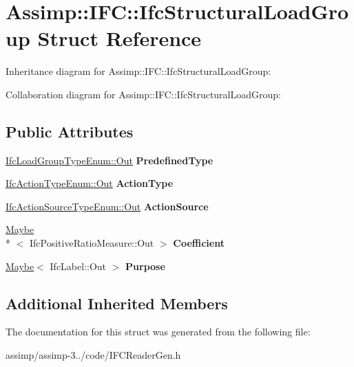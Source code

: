 \hypertarget{struct_assimp_1_1_i_f_c_1_1_ifc_structural_load_group}{\section{Assimp\+:\+:I\+F\+C\+:\+:Ifc\+Structural\+Load\+Group Struct Reference}
\label{struct_assimp_1_1_i_f_c_1_1_ifc_structural_load_group}
}


Inheritance diagram for Assimp\+:\+:I\+F\+C\+:\+:Ifc\+Structural\+Load\+Group\+:


Collaboration diagram for Assimp\+:\+:I\+F\+C\+:\+:Ifc\+Structural\+Load\+Group\+:
\subsection*{Public Attributes}
\begin{DoxyCompactItemize}
\item 
\hypertarget{struct_assimp_1_1_i_f_c_1_1_ifc_structural_load_group_a135570759497f46f4d4e6abe74a517a1}{\hyperlink{classboost_1_1shared__ptr}{Ifc\+Load\+Group\+Type\+Enum\+::\+Out} {\bfseries Predefined\+Type}}\label{struct_assimp_1_1_i_f_c_1_1_ifc_structural_load_group_a135570759497f46f4d4e6abe74a517a1}

\item 
\hypertarget{struct_assimp_1_1_i_f_c_1_1_ifc_structural_load_group_ab2a860105de934d332e4ad62054c8770}{\hyperlink{classboost_1_1shared__ptr}{Ifc\+Action\+Type\+Enum\+::\+Out} {\bfseries Action\+Type}}\label{struct_assimp_1_1_i_f_c_1_1_ifc_structural_load_group_ab2a860105de934d332e4ad62054c8770}

\item 
\hypertarget{struct_assimp_1_1_i_f_c_1_1_ifc_structural_load_group_a230e502c4043c8632e2072d56c5b116e}{\hyperlink{classboost_1_1shared__ptr}{Ifc\+Action\+Source\+Type\+Enum\+::\+Out} {\bfseries Action\+Source}}\label{struct_assimp_1_1_i_f_c_1_1_ifc_structural_load_group_a230e502c4043c8632e2072d56c5b116e}

\item 
\hypertarget{struct_assimp_1_1_i_f_c_1_1_ifc_structural_load_group_a4b748ae3b961c71f3f01b9233a0f8c7b}{\hyperlink{struct_assimp_1_1_s_t_e_p_1_1_maybe}{Maybe}\\*
$<$ Ifc\+Positive\+Ratio\+Measure\+::\+Out $>$ {\bfseries Coefficient}}\label{struct_assimp_1_1_i_f_c_1_1_ifc_structural_load_group_a4b748ae3b961c71f3f01b9233a0f8c7b}

\item 
\hypertarget{struct_assimp_1_1_i_f_c_1_1_ifc_structural_load_group_af1b552e8d6a2755f4419f07299a1444b}{\hyperlink{struct_assimp_1_1_s_t_e_p_1_1_maybe}{Maybe}$<$ Ifc\+Label\+::\+Out $>$ {\bfseries Purpose}}\label{struct_assimp_1_1_i_f_c_1_1_ifc_structural_load_group_af1b552e8d6a2755f4419f07299a1444b}

\end{DoxyCompactItemize}
\subsection*{Additional Inherited Members}


The documentation for this struct was generated from the following file\+:\begin{DoxyCompactItemize}
\item 
assimp/assimp-\/3../code/I\+F\+C\+Reader\+Gen.\+h\end{DoxyCompactItemize}
